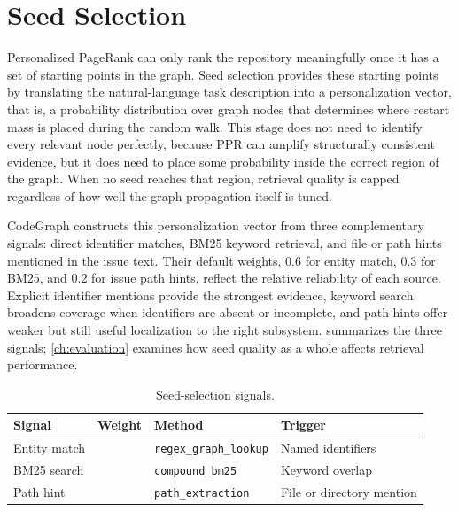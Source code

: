 \section{Seed Selection}
\label{sec:seed-selection}

Personalized PageRank can only rank the repository meaningfully once it has a set of starting points in the graph. Seed selection provides these starting points by translating the natural-language task description into a personalization vector, that is, a probability distribution over graph nodes that determines where restart mass is placed during the random walk. This stage does not need to identify every relevant node perfectly, because PPR can amplify structurally consistent evidence, but it does need to place some probability inside the correct region of the graph. When no seed reaches that region, retrieval quality is capped regardless of how well the graph propagation itself is tuned.

CodeGraph constructs this personalization vector from three complementary signals: direct identifier matches, BM25 keyword retrieval, and file or path hints mentioned in the issue text. Their default weights, 0.6 for entity match, 0.3 for BM25, and 0.2 for issue path hints, reflect the relative reliability of each source. Explicit identifier mentions provide the strongest evidence, keyword search broadens coverage when identifiers are absent or incomplete, and path hints offer weaker but still useful localization to the right subsystem.  summarizes the three signals; \cref{ch:evaluation} examines how seed quality as a whole affects retrieval performance.

\begin{table}[H]
    \centering
    \caption{Seed-selection signals.}
    \label{tab:seed-signals}
    \cgtablerows
    \small
    \begin{tabularx}{\textwidth}{@{} 
        >{\RaggedRight\arraybackslash}p{3.0cm} 
        >{\centering\arraybackslash}p{1.5cm} 
        >{\RaggedRight\arraybackslash}p{4.0cm} 
        >{\RaggedRight\arraybackslash}X @{}}
        \toprule
        \textbf{Signal} & \textbf{Weight} & \textbf{Method} & \textbf{Trigger} \\
        \midrule
        Entity match & 0.6 & \texttt{regex\_graph\_lookup} & Named identifiers \\
        BM25 search & 0.3 & \texttt{compound\_bm25} & Keyword overlap \\
        Path hint & 0.2 & \texttt{path\_extraction} & File or directory mention \\
        \bottomrule
    \end{tabularx}
\end{table}

